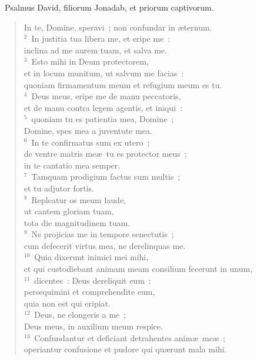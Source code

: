 ~\lettrine[lines=10,image=true,loversize=0.05,lraise=-0.03]{P}{}salmus David, filiorum Jonadab, et priorum captivorum. \begin{flushleft}\begin{verse}\vspace{6pt}In te, Domine, speravi~; non confundar in \ae ternum.\\
${}^{2}$~In justitia tua libera me, et eripe me~:\\ inclina ad me aurem tuam, et salva me.\\
${}^{3}$~Esto mihi in Deum protectorem,\\ et in locum munitum, ut salvum me facias~:\\ quoniam firmamentum meum et refugium meum es tu.\\
${}^{4}$~Deus meus, eripe me de manu peccatoris,\\ et de manu contra legem agentis, et iniqui~:\\
${}^{5}$~quoniam tu es patientia mea, Domine~;\\ Domine, spes mea a juventute mea.\\
${}^{6}$~In te confirmatus sum ex utero~;\\ de ventre matris me\ae\ tu es protector meus~;\\ in te cantatio mea semper.\\
${}^{7}$~Tamquam prodigium factus sum multis~;\\ et tu adjutor fortis.\\
${}^{8}$~Repleatur os meum laude,\\ ut cantem gloriam tuam,\\ tota die magnitudinem tuam.\\
${}^{9}$~Ne projicias me in tempore senectutis~;\\ cum defecerit virtus mea, ne derelinquas me.\\
${}^{10}$~Quia dixerunt inimici mei mihi,\\ et qui custodiebant animam meam consilium fecerunt in unum,\\
${}^{11}$~dicentes~: Deus dereliquit eum~:\\ persequimini et comprehendite eum,\\ quia non est qui eripiat.\\
${}^{12}$~Deus, ne elongeris a me~;\\ Deus meus, in auxilium meum respice.\\
${}^{13}$~Confundantur et deficiant detrahentes anim\ae\ me\ae~;\\ operiantur confusione et pudore qui qu\ae runt mala mihi.\\

\end{verse}
\end{flushleft}
